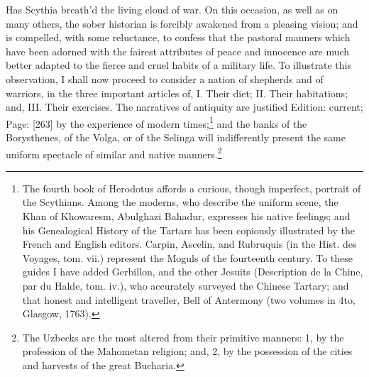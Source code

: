 {Has Scythia breath\texthebrew{}’d the living cloud of war.} On this occasion, as well as on many others, the sober historian is forcibly awakened from a pleasing vision; and is compelled, with some reluctance, to confess that the pastoral manners which have been adorned with the fairest attributes of peace and innocence are much better adapted to the fierce and cruel habits of a military life. To illustrate this observation, I shall now proceed to consider a nation of shepherds and of warriors, in the three important articles of, I. Their diet; II. Their habitations; and, III. Their exercises. The narratives of antiquity are justified Edition: current; Page: [263] by the experience of modern times;\footnote{The fourth book of Herodotus affords a curious, though imperfect, portrait of the Scythians. Among the moderns, who describe the uniform scene, the Khan of Khowaresm, Abulghazi Bahadur, expresses his native feelings; and his Genealogical History of the Tartars has been copiously illustrated by the French and English editors. Carpin, Ascelin, and Rubruquis (in the Hist. des Voyages, tom. vii.) represent the Moguls of the fourteenth century. To these guides I have added Gerbillon, and the other Jesuits (Description de la Chine, par du Halde, tom. iv.), who accurately surveyed the Chinese Tartary; and that honest and intelligent traveller, Bell of Antermony (two volumes in 4to, Glasgow, 1763).} and the banks of the Borysthenes, of the Volga, or of the Selinga will indifferently present the same uniform spectacle of similar and native manners.\footnote{The Uzbecks are the most altered from their primitive manners: 1, by the profession of the Mahometan religion; and, 2, by the possession of the cities and harvests of the great Bucharia.}

